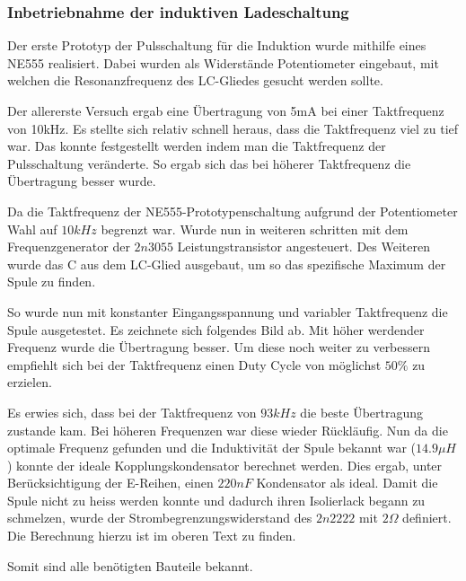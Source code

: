\subsubsection*{Inbetriebnahme der induktiven Ladeschaltung}\label{sec:erkenntnisse}

Der erste Prototyp der Pulsschaltung für die Induktion wurde mithilfe eines NE555 realisiert. Dabei wurden als Widerstände Potentiometer eingebaut, mit welchen die Resonanzfrequenz des LC-Gliedes gesucht werden sollte.

Der allererste Versuch ergab eine Übertragung von 5mA bei einer Taktfrequenz von 10kHz. Es stellte sich relativ schnell heraus, dass die Taktfrequenz viel zu tief war. Das konnte festgestellt werden indem man die Taktfrequenz der Pulsschaltung veränderte. So ergab sich das bei höherer Taktfrequenz die Übertragung besser wurde.

Da die Taktfrequenz der NE555-Prototypenschaltung aufgrund der Potentiometer Wahl auf $10kHz$ begrenzt war. Wurde nun in weiteren schritten mit dem Frequenzgenerator der $2n3055$ Leistungstransistor angesteuert. Des Weiteren wurde das C aus dem LC-Glied ausgebaut, um so das spezifische Maximum der Spule zu finden.

So wurde nun mit konstanter Eingangsspannung und variabler Taktfrequenz die Spule ausgetestet. Es zeichnete sich folgendes Bild ab. Mit höher werdender Frequenz wurde die Übertragung besser. Um diese noch weiter zu verbessern empfiehlt sich bei der Taktfrequenz einen Duty Cycle von möglichst $50\%$ zu erzielen.

Es erwies sich, dass bei der Taktfrequenz von $93kHz$ die beste Übertragung zustande kam. Bei höheren Frequenzen war diese wieder Rückläufig. Nun da die optimale Frequenz gefunden und die Induktivität der Spule bekannt war ($14.9\mu H$) konnte der ideale Kopplungskondensator berechnet werden. Dies ergab, unter Berücksichtigung der E-Reihen, einen $220nF$ Kondensator als ideal. Damit die Spule nicht zu heiss werden konnte und dadurch ihren Isolierlack begann zu schmelzen, wurde der Strombegrenzungswiderstand des $2n2222$ mit $2\Omega$ definiert. Die Berechnung hierzu ist im oberen Text zu finden.

Somit sind alle benötigten Bauteile bekannt.

